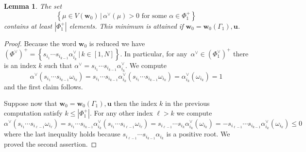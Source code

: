 \documentclass[a4paper]{amsart}
\newtheorem{lemma}[theorem]{Lemma}
\theoremstyle{definition}
\newcommand{\bfu}{\mathbf{u}}
\newcommand{\bfw}{\mathbf{w}}
\begin{document}
\begin{lemma}
  \label{lem: v-weights}
 The set
 \[
   \left\{\mu\in V(\bfw_0) \,|\, \alpha^\vee(\mu) > 0 \mbox{ for some } \alpha\in\Phi^+_1\right\}
 \]
 contains at least $|\Phi^+_1|$ elements.
 This minimum is attained if $\bfw_0=\bfw_0(\Gamma_1),\bfu$.
\end{lemma}
\begin{proof}
  Because the word $\bfw_0$ is reduced we have $\left(\Phi^\vee\right)^+=\left\{s_{i_1}\cdots s_{i_{k-1}} \alpha_{i_k}^\vee\,|\,k\in[1,N]\right\}$.
  In particular, for any~$\alpha^\vee\in\left(\Phi_1^\vee\right)^+$ there is an index $k$ such that $\alpha^\vee=s_{i_1}\cdots s_{i_{k-1}} \alpha_{i_k}^\vee$.
  We compute 
  \[
    \alpha^\vee(s_{i_1}\cdots s_{i_{k-1}}\omega_{i_k})
    =
    s_{i_1}\cdots s_{i_{k-1}} \alpha_{i_k}^\vee(s_{i_1}\cdots s_{i_{k-1}}\omega_{i_k})
    =
    \alpha_{i_k}^\vee(\omega_{i_k})
    =
    1
  \]
  and the first claim follows.

  Suppose now that $\bfw_0=\bfw_0(\Gamma_1),\bfu$ then the index $k$ in the previous computation satisfy $k\leq |\Phi_1^+|$.
  For any other index $\ell>k$ we compute
  \[
    \alpha^\vee(s_{i_1}\cdots s_{i_{\ell-1}}\omega_{i_\ell})
    =
    s_{i_1}\cdots s_{i_{k-1}} \alpha_{i_k}^\vee(s_{i_1}\cdots s_{i_{\ell-1}}\omega_{i_\ell})
    =
    s_{i_{\ell-1}}\cdots s_{i_k}\alpha_{i_k}^\vee(\omega_{i_k})
    =
    -s_{i_{\ell-1}}\cdots s_{i_{k-1}}\alpha_{i_k}^\vee(\omega_{i_k})
    \leq
    0
  \]
  where the last inequality holds because $s_{i_{\ell-1}}\cdots s_{i_{k-1}}\alpha_{i_k}$ is a positive root.
  We proved the second assertion.
\end{proof}
\end{document}

